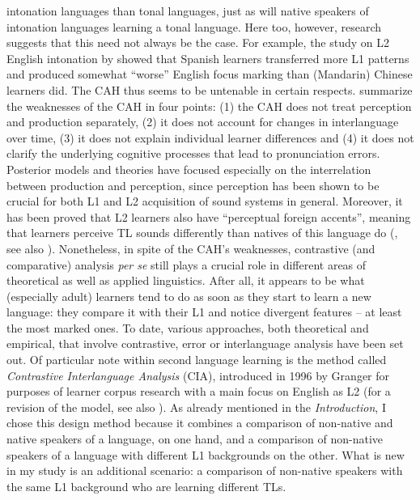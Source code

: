 intonation languages than tonal languages, just as will native speakers of intonation languages learning a tonal language. Here too, however, research suggests that this need not always be the case. For example, the study on L2 English intonation by \citet{Ortega-LlebariaColantoni2014} showed that Spanish learners transferred more L1 patterns and produced somewhat “worse” English focus marking than (Mandarin) Chinese learners did. The CAH thus seems to be untenable in certain respects. \citet[64--65]{DerwingMunro2015} summarize the weaknesses of the CAH in four points: (1) the CAH does not treat perception and production separately, (2) it does not account for changes in interlanguage over time, (3) it does not explain individual learner differences and (4) it does not clarify the underlying cognitive processes that lead to pronunciation errors. Posterior models and theories have focused especially on the interrelation between production and perception, since perception has been shown to be crucial for both L1 and L2 acquisition of sound systems in general. Moreover, it has been proved that L2 learners also have “perceptual foreign accents”, meaning that learners perceive TL sounds differently than natives of this language do (\citealt[22]{Strange1995}, see also \citealt{McAllister1997}). Nonetheless, in spite of the CAH’s weaknesses, contrastive (and comparative) analysis \textit{per se} still plays a crucial role in different areas of theoretical as well as applied linguistics. After all, it appears to be what (especially adult) learners tend to do as soon as they start to learn a new language: they compare it with their L1 and notice divergent features -- at least the most marked ones. To date, various approaches, both theoretical and empirical, that involve contrastive, error or interlanguage analysis have been set out. Of particular note within second language learning is the method called \textit{Contrastive Interlanguage Analysis} (CIA), introduced in 1996 by Granger for purposes of learner corpus research with a main focus on English as L2 (for a revision of the model, see also \citealt{Granger2015}). As already mentioned in the \textit{Introduction}, I chose this design method because it combines a comparison of non-native and native speakers of a language, on one hand, and a comparison of non-native speakers of a language with different L1 backgrounds on the other. What is new in my study is an additional scenario: a comparison of non-native speakers with the same L1 background who are learning different TLs.



